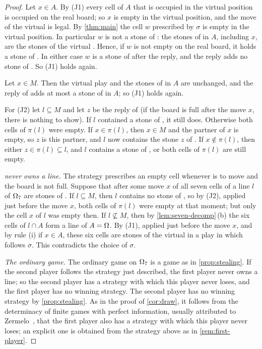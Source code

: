 \begin{proof}
Let $x\in A$. By (J1) every cell of $A$ that is occupied in the virtual position is occupied on the
real board; so $x$ is empty in the virtual position, and the move of the virtual \Maker{} is legal. By
\cref{thm:main} the cell $w$ prescribed by $\sigma$ is empty in the virtual position. In particular $w$
is not a stone of \Maker: the stones of \Maker{} in $A$, including $x$, are the stones of the virtual
\Maker. Hence, if $w$ is not empty on the real board, it holds a stone of \Breaker. In either case $w$ is
a stone of \Breaker{} after the reply, and the reply adds no stone of \Maker. So (J1) holds again.

Let $x\in M$. Then the virtual play and the stones of \Maker{} in $A$ are unchanged, and the reply of
\Breaker{} adds at most a stone of \Breaker{} in $A$; so (J1) holds again.

For (J2) let $l\subseteq M$ and let $z$ be the reply of \Breaker{} (if the board is full after the
move $x$, there is nothing to show). If $l$ contained a stone of \Breaker, it still does. Otherwise
both cells of $\pi(l)$ were empty. If $x\in\pi(l)$, then $x\in M$ and the partner of $x$ is empty,
so $z$ is this partner, and $l$ now contains the stone $z$ of \Breaker. If $x\notin\pi(l)$, then
either $z\in\pi(l)\subseteq l$, and $l$ contains a stone of \Breaker, or both cells of
$\pi(l)$ are still empty.

\smallskip\noindent\emph{\Maker{} never owns a line.} The strategy prescribes an empty cell whenever
\Breaker{} is to move and the board is not full. Suppose that after some move $x$ of \Maker{} all seven
cells of a line $l$ of $\Omega_7$ are stones of \Maker. If $l\subseteq M$, then $l$ contains no
stone of \Breaker, so by (J2), applied just before the move $x$, both cells of $\pi(l)$ were empty at
that moment; but only the cell $x$ of $l$ was empty then. If $l\not\subseteq M$, then by
\cref{lem:seven-decomp}\,(b) the six cells of $l\cap A$ form a line of $A=\Omega$. By (J1), applied just
before the move $x$, and by rule (i) if $x\in A$, these six cells are stones of the virtual \Maker{} in
a play in which \Breaker{} follows $\sigma$. This contradicts the choice of $\sigma$.

\smallskip\noindent\emph{The ordinary game.} The ordinary game on $\Omega_7$ is a game as in
\cref{prop:stealing}. If the second player follows the strategy just described, the first player never
owns a line; so the second player has a strategy with which this player never loses, and the first
player has no winning strategy. The second player has no winning strategy by \cref{prop:stealing}. As in
the proof of \cref{cor:draw}, it follows from the determinacy of finite games with perfect information,
usually attributed to Zermelo~\cite{Zermelo1913}, that the first player also has a strategy with which
this player never loses; an explicit one is obtained from the strategy above as in \cref{rem:first-player}.
\end{proof}

